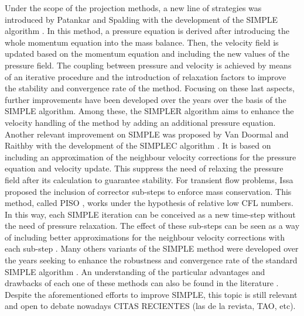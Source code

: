 \documentclass[final,3p,times,11pt,onecolumn]{myElsarticle}
\numberwithin{equation}{section}
\begin{document}
Under the scope of the projection methods, a new line of strategies was introduced by Patankar and Spalding with the development of the SIMPLE algorithm \cite{patankar1972}. In this method, a pressure equation is derived after introducing the whole momentum equation into the mass balance. Then, the velocity field is updated based on the momentum equation and including the new values of the pressure field. The coupling between pressure and velocity is achieved by means of an iterative procedure and the introduction of relaxation factors to improve the stability and convergence rate of the method. Focusing on these last aspects, further improvements have been developed over the years over the basis of the SIMPLE algorithm. Among these, the SIMPLER algorithm \cite{patankar1980} aims to enhance the velocity handling of the method by adding an additional pressure equation. Another relevant improvement on SIMPLE was proposed by Van Doormal and Raithby with the development of the SIMPLEC algorithm \cite{vanDoormal}. It is based on including an approximation of the neighbour velocity corrections for the pressure equation and velocity update. This suppress the need of relaxing the pressure field after its calculation to guarantee stability. For transient flow problems, Issa proposed the inclusion of corrector sub-steps to enforce mass conservation. This method, called PISO \cite{issa,issa2}, works under the hypothesis of relative low CFL numbers. In this way, each SIMPLE iteration can be conceived as a new time-step without the need of pressure relaxation. The effect of these sub-steps can be seen as a way of including better approximations for the neighbour velocity corrections with each sub-step \cite{moukalled}. Many others variants of the SIMPLE method were developed over the years seeking to enhance the robustness and convergence rate of the standard SIMPLE algorithm \cite{tao,qu,cheng2,sun}. An understanding of the particular advantages and drawbacks of each one of these methods can also be found in the literature \cite{moukalled, liu, wang}. Despite the aforementioned efforts to improve SIMPLE, this topic is still relevant and open to debate nowadays {\color{red} CITAS RECIENTES (las de la revista, TAO, etc)}.
\end{document}
